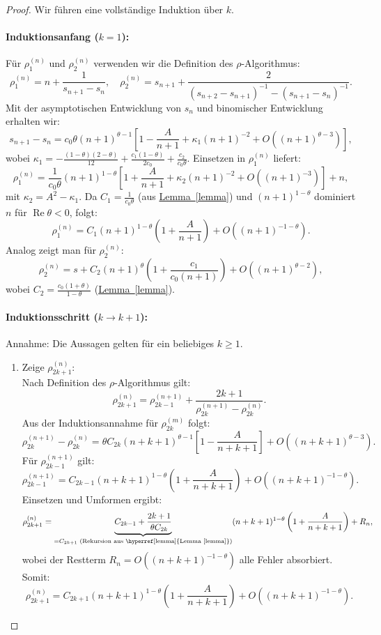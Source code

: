 \documentclass[a4paper,12pt]{article}
\numberwithin{equation}{section}
\newcommand{\lemref}[1]{\hyperref[#1]{Lemma~\ref*{#1}}}
\theoremstyle{remark}
\begin{document}
\begin{proof}
Wir führen eine vollständige Induktion über \(k\). 

\paragraph{Induktionsanfang (\(k = 1\)):}
Für \(\rho_1^{(n)}\) und \(\rho_2^{(n)}\) verwenden wir die Definition des \(\rho\)-Algorithmus:
\[
\rho_1^{(n)} = n + \frac{1}{s_{n+1} - s_n}, \quad
\rho_2^{(n)} = s_{n+1} + \frac{2}{(s_{n+2} - s_{n+1})^{-1} - (s_{n+1} - s_n)^{-1}}.
\]
Mit der asymptotischen Entwicklung von \(s_n\) und binomischer Entwicklung erhalten wir:
\[
s_{n+1} - s_n = c_0 \theta (n + 1)^{\theta - 1} \left[ 1 - \frac{A}{n + 1} + \kappa_1 (n + 1)^{-2} + O\left( (n + 1)^{\theta - 3} \right) \right],
\]
wobei \(\kappa_1 = -\frac{(1 - \theta)(2 - \theta)}{12} + \frac{c_1 (1 - \theta)}{2c_0} + \frac{c_2}{c_0 \theta}\). Einsetzen in \(\rho_1^{(n)}\) liefert:
\[
\rho_1^{(n)} = \frac{1}{c_0 \theta} (n + 1)^{1 - \theta} \left[ 1 + \frac{A}{n + 1} + \kappa_2 (n + 1)^{-2} + O\left( (n + 1)^{-3} \right) \right] + n,
\]
mit \(\kappa_2 = A^2 - \kappa_1\). Da \(C_1 = \frac{1}{c_0 \theta}\) (aus \lemref{lemma}) und \((n + 1)^{1 - \theta}\) dominiert \(n\) für \(\operatorname{Re} \theta < 0\), folgt:
\[
\rho_1^{(n)} = C_1 (n + 1)^{1 - \theta} \left( 1 + \frac{A}{n + 1} \right) + O\left( (n + 1)^{-1 - \theta} \right).
\]
Analog zeigt man für \(\rho_2^{(n)}\):
\[
\rho_2^{(n)} = s + C_2 (n + 1)^{\theta} \left( 1 + \frac{c_1}{c_0 (n + 1)} \right) + O\left( (n + 1)^{\theta - 2} \right),
\]
wobei \(C_2 = \frac{c_0 (1 + \theta)}{1 - \theta}\) (\lemref{lemma}).

\paragraph{Induktionsschritt (\(k \to k + 1\)):} 
Annahme: Die Aussagen gelten für ein beliebiges \(k \geq 1\).

\begin{enumerate}
\item {Zeige \(\rho_{2k+1}^{(n)}\):} \\
Nach Definition des \(\rho\)-Algorithmus gilt:
\[
\rho_{2k+1}^{(n)} = \rho_{2k-1}^{(n+1)} + \frac{2k + 1}{\rho_{2k}^{(n+1)} - \rho_{2k}^{(n)}}.
\]
Aus der Induktionsannahme für \(\rho_{2k}^{(m)}\) folgt:
\[
\rho_{2k}^{(n+1)} - \rho_{2k}^{(n)} = \theta C_{2k} (n + k + 1)^{\theta - 1} \left[ 1 - \frac{A}{n + k + 1} \right] + O\left( (n + k + 1)^{\theta - 3} \right).
\]
Für \(\rho_{2k-1}^{(n+1)}\) gilt:
\[
\rho_{2k-1}^{(n+1)} = C_{2k-1} (n + k + 1)^{1 - \theta} \left( 1 + \frac{A}{n + k + 1} \right) + O\left( (n + k + 1)^{-1 - \theta} \right).
\]
Einsetzen und Umformen ergibt:
\[
\rho_{2k+1}^{(n)} = \underbrace{C_{2k-1} + \frac{2k + 1}{\theta C_{2k}}}_{= C_{2k+1} \text{ (Rekursion aus \lemref{lemma})}} (n + k + 1)^{1 - \theta} \left( 1 + \frac{A}{n + k + 1} \right) + R_n,
\]
wobei der Restterm \(R_n = O\left( (n + k + 1)^{-1 - \theta} \right)\) alle Fehler absorbiert. Somit:
\[
\rho_{2k+1}^{(n)} = C_{2k+1} (n + k + 1)^{1 - \theta} \left( 1 + \frac{A}{n + k + 1} \right) + O\left( (n + k + 1)^{-1 - \theta} \right).
\]


\end{enumerate}
\end{proof}
\end{document}
